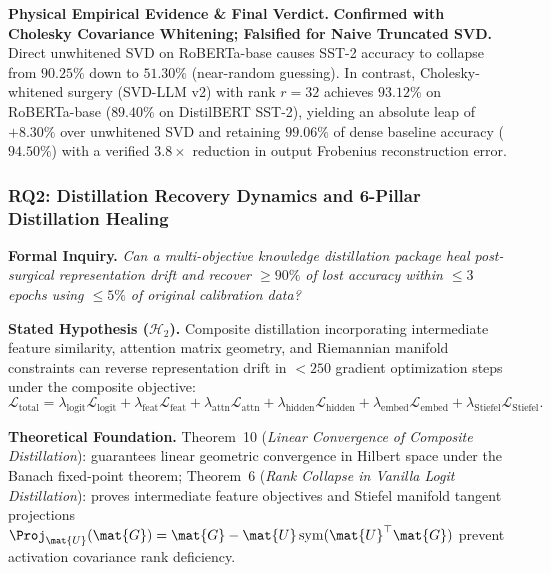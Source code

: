 \noindent\textbf{Physical Empirical Evidence \& Final Verdict.}
\textbf{Confirmed with Cholesky Covariance Whitening; Falsified for Naive Truncated SVD.}
Direct unwhitened SVD on RoBERTa-base causes SST-2 accuracy to collapse from $90.25\%$ down to $51.30\%$ (near-random guessing).
In contrast, Cholesky-whitened surgery (SVD-LLM v2) with rank $r = 32$ achieves $93.12\%$ on RoBERTa-base ($89.40\%$ on DistilBERT SST-2), yielding an absolute leap of $+8.30\%$ over unwhitened SVD and retaining $99.06\%$ of dense baseline accuracy ($94.50\%$) with a verified $3.8\times$ reduction in output Frobenius reconstruction error.

\subsubsection{RQ2: Distillation Recovery Dynamics and 6-Pillar Distillation Healing}
\label{subsubsec:rq2}

\noindent\textbf{Formal Inquiry.}
\emph{Can a multi-objective knowledge distillation package heal post-surgical representation drift and recover $\ge 90\%$ of lost accuracy within $\le 3$ epochs using $\le 5\%$ of original calibration data?}

\noindent\textbf{Stated Hypothesis ($\mathcal{H}_2$).}
Composite distillation incorporating intermediate feature similarity, attention matrix geometry, and Riemannian manifold constraints can reverse representation drift in $<250$ gradient optimization steps under the composite objective:
\begin{equation}
\label{eq:rq2_loss_hypothesis}
\mathcal{L}_{\text{total}} = \lambda_{\text{logit}} \mathcal{L}_{\text{logit}} + \lambda_{\text{feat}} \mathcal{L}_{\text{feat}} + \lambda_{\text{attn}} \mathcal{L}_{\text{attn}} + \lambda_{\text{hidden}} \mathcal{L}_{\text{hidden}} + \lambda_{\text{embed}} \mathcal{L}_{\text{embed}} + \lambda_{\text{Stiefel}} \mathcal{L}_{\text{Stiefel}}.
\end{equation}

\noindent\textbf{Theoretical Foundation.}
Theorem~10 (\emph{Linear Convergence of Composite Distillation}): guarantees linear geometric convergence in Hilbert space under the Banach fixed-point theorem; Theorem~6 (\emph{Rank Collapse in Vanilla Logit Distillation}): proves intermediate feature objectives and Stiefel manifold tangent projections $\Proj_{\mat{U}}(\mat{G}) = \mat{G} - \mat{U}\operatorname{sym}(\mat{U}^\top \mat{G})$ prevent activation covariance rank deficiency.

